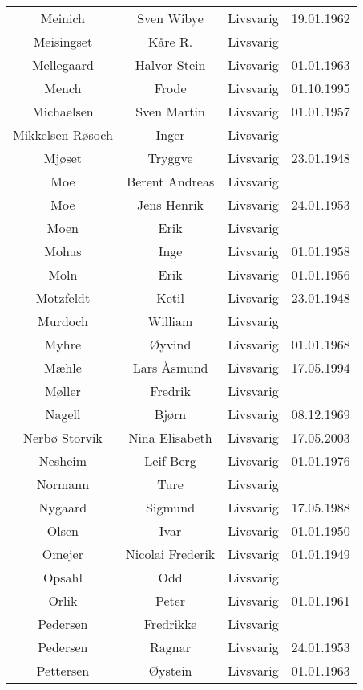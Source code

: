 \begin{tabular}{cccc}
        Meinich	&	Sven Wibye	&	Livsvarig 	&	19.01.1962	\\
        Meisingset	&	Kåre R.	&	Livsvarig 	&		\\
        Mellegaard	&	Halvor Stein	&	Livsvarig 	&	01.01.1963	\\
        Mench 	&	Frode	&	Livsvarig	&	01.10.1995	\\
        Michaelsen	&	Sven Martin	&	Livsvarig 	&	01.01.1957	\\
        Mikkelsen Røsoch	&	Inger	&	Livsvarig 	&		\\
        Mjøset	&	Tryggve	&	Livsvarig 	&	23.01.1948	\\
        Moe	&	Berent Andreas	&	Livsvarig 	&		\\
        Moe	&	Jens Henrik	&	Livsvarig 	&	24.01.1953	\\
        Moen	&	Erik	&	Livsvarig 	&		\\
        Mohus	&	Inge	&	Livsvarig 	&	01.01.1958	\\
        Moln	&	Erik	&	Livsvarig 	&	01.01.1956	\\
        Motzfeldt	&	Ketil	&	Livsvarig 	&	23.01.1948	\\
        Murdoch	&	William	&	Livsvarig 	&		\\
        Myhre	&	Øyvind	&	Livsvarig 	&	01.01.1968	\\
        Mæhle	&	Lars Åsmund	&	Livsvarig 	&	17.05.1994	\\
        Møller	&	Fredrik	&	Livsvarig 	&		\\
        Nagell	&	Bjørn	&	Livsvarig 	&	08.12.1969	\\
        Nerbø Storvik 	&	Nina Elisabeth	&	Livsvarig	&	17.05.2003	\\
        Nesheim	&	Leif Berg	&	Livsvarig 	&	01.01.1976	\\
        Normann	&	Ture	&	Livsvarig 	&		\\
        Nygaard	&	Sigmund	&	Livsvarig 	&	17.05.1988	\\
        Olsen	&	Ivar	&	Livsvarig 	&	01.01.1950	\\
        Omejer	&	Nicolai Frederik	&	Livsvarig 	&	01.01.1949	\\
        Opsahl	&	Odd	&	Livsvarig 	&		\\
        Orlik	&	Peter	&	Livsvarig 	&	01.01.1961	\\
        Pedersen	&	Fredrikke	&	Livsvarig 	&		\\
        Pedersen	&	Ragnar	&	Livsvarig 	&	24.01.1953	\\
        Pettersen	&	Øystein	&	Livsvarig 	&	01.01.1963	\\

\end{tabular}
